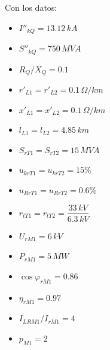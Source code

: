             Con los datos:

            \begin{minipage}{0.3\textwidth}
                \begin{itemize}
                    \item $I''_\textit{kQ} = 13.12\,\textit{kA}$
                    \item $S''_\textit{kQ} = 750\,\textit{MVA}$
                    \item $R_\textit{Q}/X_\textit{Q} = 0.1$
                    \item $r'_\textit{L1} = r'_\textit{L2} = 0.1\,\varOmega/\textit{km}$
                    \item $x'_\textit{L1} = x'_\textit{L2} = 0.1\,\varOmega/\textit{km}$
                    \item $l_\textit{L1} = l_\textit{L2} = 4.85\,\textit{km}$
                \end{itemize}
            \end{minipage}
            \begin{minipage}{0.3\textwidth}
                \begin{itemize}
                    \item $S_\textit{rT1} = S_\textit{rT2} = 15\,\textit{MVA}$
                    \item $u_\textit{krT1} = u_\textit{krT2} = 15\!\text{\%}$
                    \item $u_\textit{RrT1} = u_\textit{RrT2} = 0.6\!\text{\%}$
                    \item $r_\textit{tT1} = r_\textit{tT2} = \dfrac{33\,\textit{kV}}{6.3\,\textit{kV}}$
                \end{itemize}
            \end{minipage}
            \begin{minipage}{0.2\textwidth}
                \begin{itemize}
                    \item $U_\textit{rM1} = 6\,\textit{kV}$
                    \item $P_\textit{rM1} = 5\,\textit{MW}$
                    \item $\cos\varphi_\textit{rM1} = 0.86$
                    \item $\eta_\textit{rM1} = 0.97$
                    \item $I_\textit{LRM1}/I_\textit{rM1} = 4$
                    \item $p_\textit{M1} = 2$
                \end{itemize}
            \end{minipage}
